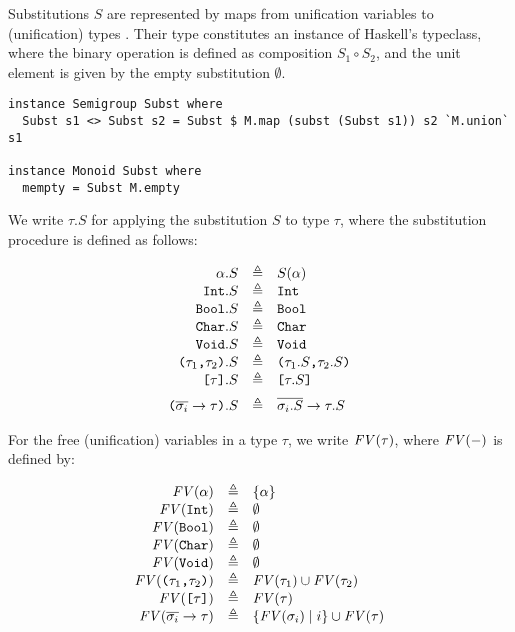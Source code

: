 Substitutions $S$ are represented by maps from unification variables
 to (unification) types . Their type 
constitutes an instance of Haskell's  typeclass, where the
binary operation is defined as composition $S_1 \circ S_2$, and the unit element
is given by the empty substitution $\emptyset$.

\begin{verbatim}
instance Semigroup Subst where
  Subst s1 <> Subst s2 = Subst $ M.map (subst (Subst s1)) s2 `M.union` s1

instance Monoid Subst where
  mempty = Subst M.empty
\end{verbatim}

We write $\tau.S$ for applying the substitution $S$ to type $\tau$, where the
substitution procedure is defined as follows:

\[
\begin{array}{rcl}
  \alpha.S & \eqdef & S(\alpha) \\
  \Int.S & \eqdef & \Int \\
  \Bool.S & \eqdef & \Bool \\
  \Char.S & \eqdef & \Char \\
  \Void.S & \eqdef & \Void \\
  \TProd{\tau_1}{\tau_2}.S & \eqdef & \TProd{\tau_1.S}{\tau_2.S} \\
  \TList{\tau}.S & \eqdef & \TList{\tau.S} \br
  \Parens{ \TFun{\set{\sigma_i}}{\tau} }.S & \eqdef & \TFun{\set{\sigma_i.S}}{\tau.S}
\end{array}
\]

For the free (unification) variables in a type $\tau$, we write $\mathit{FV}(\tau)$, where
$\mathit{FV}(-)$ is defined by:

\[
\begin{array}{rcl}
  \mathit{FV}(\alpha) & \triangleq & \{ \alpha \} \\
  \mathit{FV}(\texttt{Int}) & \triangleq & \emptyset \\
  \mathit{FV}(\texttt{Bool}) & \triangleq & \emptyset \\
  \mathit{FV}(\texttt{Char}) & \triangleq & \emptyset \\
  \mathit{FV}(\texttt{Void}) & \triangleq & \emptyset \\
  \mathit{FV}( \texttt{(}\tau_1\texttt{,}\tau_2\texttt{)} ) & \triangleq & \mathit{FV}(\tau_1) \cup \mathit{FV}(\tau_2) \\
  \mathit{FV}( \texttt{[}\tau\texttt{]} ) & \triangleq & \mathit{FV}(\tau) \\
  \mathit{FV}( \overline{\sigma_i} \to \tau ) & \triangleq & \{ \mathit{FV}(\sigma_i) \mid i \} \cup \mathit{FV}(\tau)
\end{array}
\]

